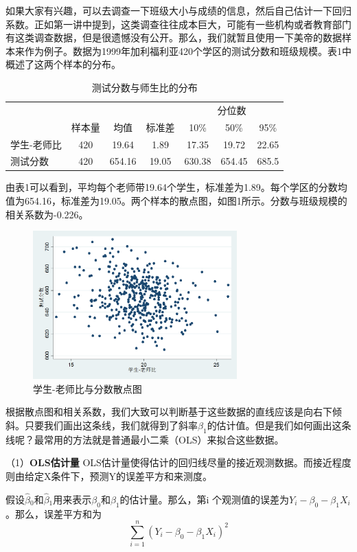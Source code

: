 \documentclass[cn,10pt,math=newtx,citestyle=gb7714-2015,bibstyle=gb7714-2015]{elegantbook}
\begin{document}
	如果大家有兴趣，可以去调查一下班级大小与成绩的信息，然后自己估计一下回归系数。正如第一讲中提到，这类调查往往成本巨大，可能有一些机构或者教育部门有这类调查数据，但是很遗憾没有公开。那么，我们就暂且使用一下美帝的数据样本来作为例子。数据为1999年加利福利亚420个学区的测试分数和班级规模。表1中概述了这两个样本的分布。
	\begin{table}[htbp]
		\caption{测试分数与师生比的分布}\label{tab:digit}
		\centering
		\begin{tabular}{lcccccc}
			\hline
			&&&&\multicolumn{3}{c}{分位数}\\
			\cline{5-7}
			&样本量&均值&标准差&10\%&50\%&95\%\\
			\cline{1-7}
			学生-老师比&420&19.64&1.89&17.35&19.72&22.65\\
			\cline{1-7}
			测试分数&420&654.16&19.05&630.38&654.45&685.5\\
			\hline
		\end{tabular}
	\end{table}
	
	由表1可以看到，平均每个老师带19.64个学生，标准差为1.89。每个学区的分数均值为654.16，标准差为19.05。两个样本的散点图，如图1所示。分数与班级规模的相关系数为-0.226。
	\begin{figure}[htbp]
		\centering
		\includegraphics[width=0.7\textwidth]{score.png}
		\caption{学生-老师比与分数散点图}\label{fig:digit}
	\end{figure}
	
	根据散点图和相关系数，我们大致可以判断基于这些数据的直线应该是向右下倾斜。只要我们画出这条线，我们就得到了斜率$\beta_1$的估计值。但是我们如何画出这条线呢？最常用的方法就是普通最小二乘（OLS）来拟合这些数据。
	
	（1）\textbf{OLS估计量}
	OLS估计量使得估计的回归线尽量的接近观测数据。而接近程度则由给定X条件下，预测Y的误差平方和来测度。
	
	假设$\hat\beta{_0}$和$\hat\beta{_1}$用来表示$\beta_0$和$\beta_1$的估计量。那么，第i 个观测值的误差为$Y_i-\beta_0-\beta_1X_i$。那么，误差平方和为
	\begin{equation}
		\sum_{i=1}^n{(Y_i-\beta_0-\beta_1X_i)^2}
	\end{equation}
	
\end{document}
